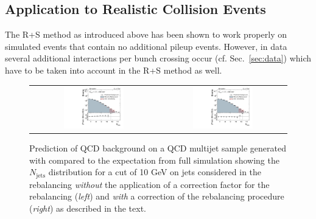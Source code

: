 \subsection{Application to Realistic Collision Events}
\label{subsec:RPlusS_app} 
The R+S method as introduced above has been shown to work properly on simulated events that contain no additional pileup events. However, in data several additional interactions per bunch crossing occur (cf. Sec.~\ref{sec:data}) which have to be taken into account in the R+S method as well. 
\begin{figure}[!t]
  \centering
  \begin{tabular}{cc}
                \includegraphics[width=0.49\textwidth]{figures/NJets_baseline_withoutMHT_madgraph_DR53X_chs_TuneZ2star_pt10_withoutPUReweighting_DoNotUseRebCorrection_v1.pdf} &
                \includegraphics[width=0.49\textwidth]{figures/NJets_baseline_withoutMHT_madgraph_DR53X_chs_TuneZ2star_pt10_withoutPUReweighting_UseRebCorrection_v1.pdf} 

  \end{tabular}
  \caption{Prediction of QCD background on a QCD multijet sample generated with \madgraph compared to the expectation from full simulation showing the $N_{\text{jets}}$ distribution for a \pt cut of 10 GeV on jets considered in the rebalancing \textit{without} the application of a correction factor for the rebalancing (\textit{left}) and \textit{with} a correction of the rebalancing procedure (\textit{right}) as described in the text.}
  \label{fig:qcd_rs_rebnjets}
\end{figure}
\\
